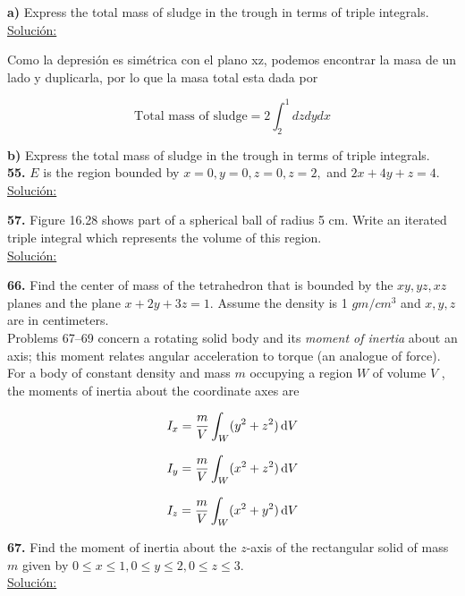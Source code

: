 \documentclass[11pt]{report}
\newcommand{\s}{\underline{Soluci\'{o}n:}}
\begin{document}
\textbf{a)} Express the total mass of sludge in the trough in terms of triple
integrals. \\

\s

Como la depresi\'{o}n es sim\'{e}trica con el plano xz, podemos encontrar la masa
de un lado y duplicarla, por lo que la masa total esta dada por

\[\text{Total mass of sludge} = 2 \int^{1}_{2} dz dy dx \]


\textbf{b)} Express the total mass of sludge in the trough in terms of triple
integrals. \\

\textbf{55.} $E$ is the region bounded by $x = 0, y = 0, z = 0, z = 2,$
and $2x + 4y + z = 4$. \\
\s

\textbf{57.} Figure 16.28 shows part of a spherical ball of radius 5 cm.
Write an iterated triple integral which represents the volume of this region. \\
\s

\textbf{66.} Find the center of mass of the tetrahedron that is bounded by the
$xy, yz, xz$ planes and the plane $x + 2y + 3z = 1$. Assume the density is
1 $gm/cm^3$ and $x, y, z$ are in centimeters. \\

Problems 67–69 concern a rotating solid body and its \textit{moment of inertia}
about an axis; this moment relates angular acceleration to torque (an analogue
of force). For a body of constant density and mass $m$ occupying a region $W$
of volume $V$ , the moments of inertia about the coordinate axes are

\[I_x = \frac{m}{V} \int _W (y^2 + z^2) \, \text d V \]

\[I_y = \frac{m}{V} \int _W (x^2 + z^2) \, \text d V \]

\[I_z = \frac{m}{V} \int _W (x^2 + y^2) \, \text d V \]

\textbf{67.} Find the moment of inertia about the $z$-axis of the rectangular
solid of mass $m$ given by $0 \leq x \leq 1, 0 \leq y \leq 2, 0 \leq z \leq 3$. \\

\s
\end{document}
